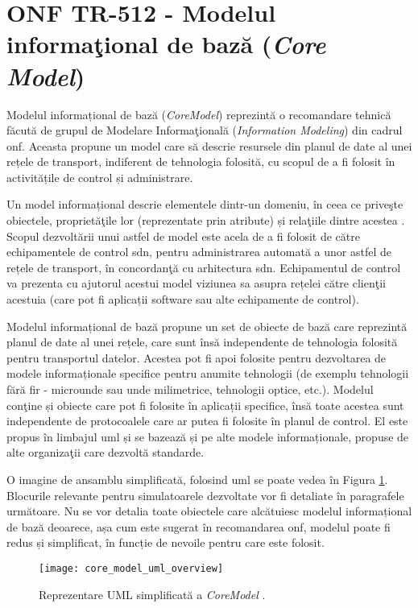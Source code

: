 \section{ONF TR-512 - Modelul informaţional de bază (\textit{Core Model})}

Modelul informațional de bază (\textit{CoreModel}) reprezintă o recomandare tehnică făcută de grupul de Modelare Informaţională (\textit{Information Modeling}) din cadrul \gls{onf}. Aceasta propune un model care să descrie resursele din planul de date al unei rețele de transport, indiferent de tehnologia folosită, cu scopul de a fi folosit în activitățile de control și administrare.

Un model informațional descrie elementele dintr-un domeniu, în ceea ce priveşte obiectele, proprietăţile lor (reprezentate prin atribute) și relaţiile dintre acestea \cite{onftr512v1.0}. Scopul dezvoltării unui astfel de model este acela de a fi folosit de către echipamentele de control \gls{sdn}, pentru administrarea automată a unor astfel de rețele de transport, în concordanţă cu arhitectura \gls{sdn}. Echipamentul de control va prezenta cu ajutorul acestui model viziunea sa asupra rețelei către clienţii acestuia (care pot fi aplicații software sau alte echipamente de control).

Modelul informațional de bază propune un set de obiecte de bază care reprezintă planul de date al unei rețele, care sunt însă independente de tehnologia folosită pentru transportul datelor. Acestea pot fi apoi folosite pentru dezvoltarea de modele informaționale specifice pentru anumite tehnologii (de exemplu tehnologii fără fir - microunde sau unde milimetrice, tehnologii optice, etc.). Modelul conţine și obiecte care pot fi folosite în aplicații specifice, însă toate acestea sunt independente de protocoalele care ar putea fi folosite în planul de control. El este propus în limbajul \gls{uml} și se bazează și pe alte modele informaționale, propuse de alte organizaţii care dezvoltă standarde.

O imagine de ansamblu simplificată, folosind \gls{uml} se poate vedea în Figura \ref{fig:core_model}. Blocurile relevante pentru simulatoarele dezvoltate vor fi detaliate în paragrafele următoare. Nu se vor detalia toate obiectele care alcătuiesc modelul informațional de bază deoarece, așa cum este sugerat în recomandarea \gls{onf}, modelul poate fi redus și simplificat, în funcție de nevoile pentru care este folosit.  

\begin{figure}[h]
	\centering
	\texttt{[image: core\_model\_uml\_overview]}
	\caption{Reprezentare UML simplificată a \textit{CoreModel} \cite{onftr512v1.2}.}
	\label{fig:core_model}
\end{figure}

